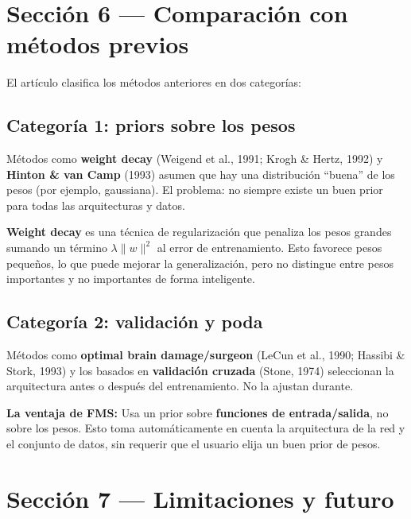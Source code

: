 \documentclass[11pt,a4paper]{article}
\newcounter{definicion}
\newenvironment{definicion}[1][]{%
  \refstepcounter{definicion}%
  \begin{tcolorbox}[colback=grisclaro,colframe=verdecorado,title=Definición \thedefinicion: #1,breakable]}%
  {\end{tcolorbox}}
\newcounter{ejemplo}
\begin{document}
\section{Sección 6 — Comparación con métodos previos}
\label{sec:sec6}

El artículo clasifica los métodos anteriores en dos categorías:

\subsection{Categoría 1: priors sobre los pesos}

Métodos como \textbf{weight decay} (Weigend et al., 1991; Krogh \& Hertz, 1992) y \textbf{Hinton \& van Camp} (1993) asumen que hay una distribución ``buena'' de los pesos (por ejemplo, gaussiana). El problema: no siempre existe un buen prior para todas las arquitecturas y datos.

\begin{definicion}[Weight decay]
\textbf{Weight decay} es una técnica de regularización que penaliza los pesos grandes sumando un término $\lambda \|w\|^2$ al error de entrenamiento. Esto favorece pesos pequeños, lo que puede mejorar la generalización, pero no distingue entre pesos importantes y no importantes de forma inteligente.
\end{definicion}

\subsection{Categoría 2: validación y poda}

Métodos como \textbf{optimal brain damage/surgeon} (LeCun et al., 1990; Hassibi \& Stork, 1993) y los basados en \textbf{validación cruzada} (Stone, 1974) seleccionan la arquitectura antes o después del entrenamiento. No la ajustan durante.

\textbf{La ventaja de FMS:} Usa un prior sobre \textbf{funciones de entrada/salida}, no sobre los pesos. Esto toma automáticamente en cuenta la arquitectura de la red y el conjunto de datos, sin requerir que el usuario elija un buen prior de pesos.

\section{Sección 7 — Limitaciones y futuro}
\label{sec:sec7}
\end{document}
